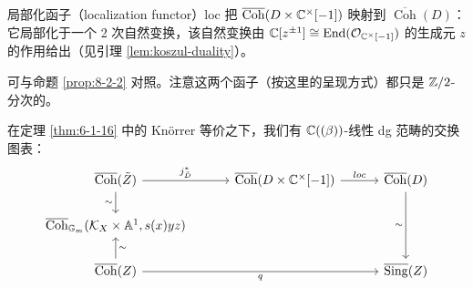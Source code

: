 \begin{definition}\label{def:8-1-4}
局部化函子（localization functor）loc 把 $\overline{\operatorname{Coh}}(D\times\mathbb{C}^\times[-1])$ 映射到 $\overline{\operatorname{Coh}}(D)$：它局部化于一个 2 次自然变换，该自然变换由 $\mathbb{C}[z^{\pm1}]\cong\operatorname{End}(\mathcal{O}_{\mathbb{C}^\times[-1]})$ 的生成元 $z$ 的作用给出（见引理 \ref{lem:koszul-duality}）。
\end{definition}

可与命题 \ref{prop:8-2-2} 对照。注意这两个函子（按这里的呈现方式）都只是 $\mathbb{Z}/2$-分次的。


\begin{proposition}\label{prop:8-1-5}
在定理 \ref{thm:6-1-16} 中的 Kn{\"o}rrer 等价之下，我们有 $\mathbb{C}((\beta))$-线性 dg 范畴的交换图表：
\[
\begin{tikzcd}[column sep=3.0em, row sep=1.7em]
\overline{\operatorname{Coh}}(\tilde Z) \arrow[r, "j_{\tilde D}^*"] \arrow[d, "{\sim}"'] & \overline{\operatorname{Coh}}(D\times\C^\times[-1]) \arrow[r, "loc"] & \overline{\operatorname{Coh}}(D) \arrow[dd, "{\sim}"'] \\
\overline{\operatorname{Coh}}_{\mathbb G_m}(\cK_X\times\mathbb A^1,s(x)yz) & & \\
\overline{\operatorname{Coh}}(Z) \arrow[u, "{\sim}"'] \arrow[rr, "q"'] & & \overline{\operatorname{Sing}}(Z)
\end{tikzcd}
\]
\end{proposition}

